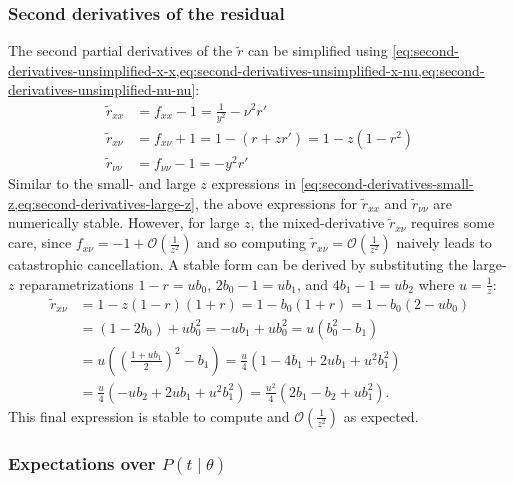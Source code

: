 \documentclass{article}
\begin{document}
\subsubsection{Second derivatives of the residual}\label{sec:second-derivatives-residual}

The second partial derivatives of the $\tilde{r}$ can be simplified using \cref{eq:second-derivatives-unsimplified-x-x,eq:second-derivatives-unsimplified-x-nu,eq:second-derivatives-unsimplified-nu-nu}:
%
\begin{align}
  \tilde{r}_{xx}     & = f_{xx} - 1 = \frac{1}{y^2} - \nu^2 r'          \\
  \tilde{r}_{x\nu}   & = f_{x\nu} + 1 = 1 - (r + z r') = 1 - z(1 - r^2) \\
  \tilde{r}_{\nu\nu} & = f_{\nu\nu} - 1 = - y^2 r'
\end{align}
%
Similar to the small- and large $z$ expressions in \cref{eq:second-derivatives-small-z,eq:second-derivatives-large-z}, the above expressions for $\tilde{r}_{xx}$ and $\tilde{r}_{\nu\nu}$ are numerically stable.
However, for large $z$, the mixed-derivative $\tilde{r}_{x\nu}$ requires some care, since $f_{x\nu} = -1 + \mathcal{O}(\frac{1}{z^2})$ and so computing $\tilde{r}_{x\nu} = \mathcal{O}(\frac{1}{z^2})$ naively leads to catastrophic cancellation.
A stable form can be derived by substituting the large-$z$ reparametrizations $1 - r = u b_0$, $2 b_0 - 1 = u b_1$, and $4 b_1 - 1 = u b_2$ where $u = \frac{1}{z}$:
%
\begin{align}
  \tilde{r}_{x\nu} & = 1 - z(1 - r)(1 + r) = 1 - b_0 (1 + r) = 1 - b_0(2 - u b_0)                       \\
                   & = (1 - 2 b_0) + u b_0^2 = -u b_1 + u b_0^2 = u (b_0^2 - b_1)                       \\
                   & = u ((\frac{1 + u b_1}{2})^2 - b_1) = \frac{u}{4} (1 - 4b_1 + 2u b_1 + u^2 b_1^2)  \\
                   & = \frac{u}{4}(-u b_2 + 2u b_1 + u^2 b_1^2) = \frac{u^2}{4}(2 b_1 - b_2 + u b_1^2).
\end{align}
%
This final expression is stable to compute and $\mathcal{O}(\frac{1}{z^2})$ as expected.

\subsubsection{Expectations over $P(t \mid \theta)$}\label{sec:expectation-covariance}
\end{document}
